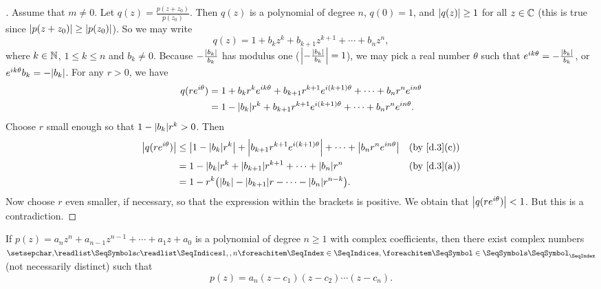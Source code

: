 \begin{proof}[]
	Assume that \(m \neq 0\).
	Let \(q(z) = \frac{p(z + z_0)}{p(z_0)}\).
	Then \(q(z)\) is a polynomial of degree \(n\), \(q(0) = 1\), and \(\left\lvert q(z)\right\rvert \geq 1\) for all \(z \in \mathbb{C}\)
	(this is true since \(\left\lvert p(z + z_0)\right\rvert \geq \left\lvert p(z_0)\right\rvert\)).
	So we may write
	\[
		q(z) = 1 + b_k z^k + b_{k + 1} z^{k + 1} + \cdots + b_n z^n,
	\]
	where \(k \in \mathbb{N}\), \(1 \leq k \leq n\) and \(b_k \neq 0\).
	Because \(-\frac{\left\lvert b_k\right\rvert}{b_k}\) has modulus one (\(\left\lvert-\frac{\left\lvert b_k\right\rvert}{b_k}\right\rvert = 1\)), we may pick a real number \(\theta\) such that \(e^{i k \theta} = - \frac{\left\lvert b_k\right\rvert}{b_k}\), or \(e^{i k \theta} b_k = -\abs{b_k}\).
	For any \(r > 0\), we have
	\begin{align*}
		q(r e^{i \theta}) & = 1 + b_k r^k e^{i k \theta} + b_{k + 1} r^{k + 1} e^{i (k + 1) \theta} + \cdots + b_n r^n e^{i n \theta} \\
		                  & = 1 - \abs{b_k} r^k + b_{k + 1} r^{k + 1} e^{i (k + 1) \theta} + \cdots + b_n r^n e^{i n \theta}.
	\end{align*}
	Choose \(r\) small enough so that \(1 - \abs{b_k} r^k > 0\).
	Then
	\begin{align*}
		\abs{q(r e^{i \theta})} & \leq \abs{1 - \abs{b_k} r^k} + \abs{b_{k + 1} r^{k + 1} e^{i (k + 1) \theta}} + \cdots + \abs{b_n r^n e^{i n \theta}} &  & \by{d.3}[c] \\
		                        & = 1 - \abs{b_k} r^k + \abs{b_{k + 1}} r^{k + 1} + \cdots + \abs{b_n} r^n                                              &  & \by{d.3}[a] \\
		                        & = 1 - r^k \pa{\abs{b_k} - \abs{b_{k + 1}} r - \cdots - \abs{b_n} r^{n - k}}.
	\end{align*}
	Now choose \(r\) even smaller, if necessary, so that the expression within the brackets is positive.
	We obtain that \(\left\lvert q(r e^{i \theta})\right\rvert < 1\).
	But this is a contradiction.
\end{proof}

\begin{cor}\label{d.0.7}
	If \(p(z) = a_n z^n + a_{n - 1} z^{n - 1} + \cdots + a_1 z + a_0\) is a polynomial of degree \(n \geq 1\) with complex coefficients, then there exist complex numbers \(\seq{c}{1,,n}\) (not necessarily distinct) such that
	\[
		p(z) = a_n (z - c_1)(z - c_2) \cdots (z - c_n).
	\]
\end{cor}

